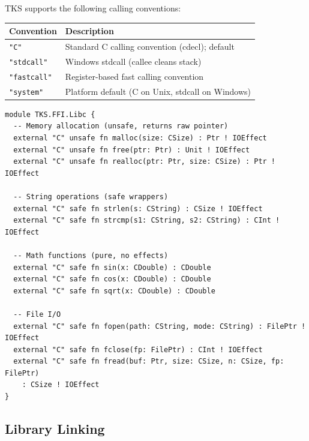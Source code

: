 \begin{definition}
\label{def:calling-conventions}
TKS supports the following calling conventions:
\begin{center}
\begin{tabular}{lp{9cm}}
\toprule
\textbf{Convention} & \textbf{Description} \\
\midrule
\texttt{"C"} & Standard C calling convention (cdecl); default \\
\texttt{"stdcall"} & Windows stdcall (callee cleans stack) \\
\texttt{"fastcall"} & Register-based fast calling convention \\
\texttt{"system"} & Platform default (C on Unix, stdcall on Windows) \\
\bottomrule
\end{tabular}
\end{center}
\end{definition}

\begin{example}
\label{ex:extern-decl}
\begin{verbatim}
module TKS.FFI.Libc {
  -- Memory allocation (unsafe, returns raw pointer)
  external "C" unsafe fn malloc(size: CSize) : Ptr ! IOEffect
  external "C" unsafe fn free(ptr: Ptr) : Unit ! IOEffect
  external "C" unsafe fn realloc(ptr: Ptr, size: CSize) : Ptr ! IOEffect

  -- String operations (safe wrappers)
  external "C" safe fn strlen(s: CString) : CSize ! IOEffect
  external "C" safe fn strcmp(s1: CString, s2: CString) : CInt ! IOEffect

  -- Math functions (pure, no effects)
  external "C" safe fn sin(x: CDouble) : CDouble
  external "C" safe fn cos(x: CDouble) : CDouble
  external "C" safe fn sqrt(x: CDouble) : CDouble

  -- File I/O
  external "C" safe fn fopen(path: CString, mode: CString) : FilePtr ! IOEffect
  external "C" safe fn fclose(fp: FilePtr) : CInt ! IOEffect
  external "C" safe fn fread(buf: Ptr, size: CSize, n: CSize, fp: FilePtr)
    : CSize ! IOEffect
}
\end{verbatim}
\end{example}

\subsection{Library Linking}
\label{subsec:library-linking}

